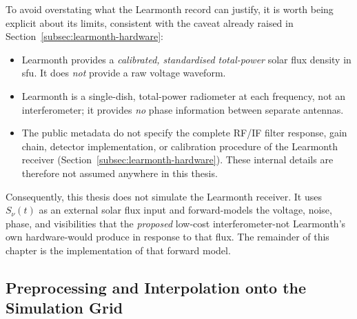 To avoid overstating what the Learmonth record can justify, it is worth being
explicit about its limits, consistent with the caveat already raised in
Section~\ref{subsec:learmonth-hardware}:
\begin{itemize}[leftmargin=1.5em,itemsep=1pt,topsep=2pt]
  \item Learmonth provides a \emph{calibrated, standardised total-power} solar
        flux density in sfu. It does \emph{not} provide a raw voltage
        waveform.
  \item Learmonth is a single-dish, total-power radiometer at each frequency,
        not an interferometer; it provides \emph{no} phase information
        between separate antennas.
  \item The public metadata do not specify the complete RF/IF filter
        response, gain chain, detector implementation, or calibration
        procedure of the Learmonth receiver (Section~\ref{subsec:learmonth-hardware}).
        These internal details are therefore not assumed anywhere in this
        thesis.
\end{itemize}
Consequently, this thesis does not simulate the Learmonth receiver. It uses
$S_\nu(t)$ as an external solar flux input and forward-models the voltage,
noise, phase, and visibilities that the \emph{proposed} low-cost
interferometer-not Learmonth's own hardware-would produce in response to
that flux. The remainder of this chapter is the implementation of that
forward model.

\subsection{Preprocessing and Interpolation onto the Simulation Grid}
\label{subsec:preprocessing}

